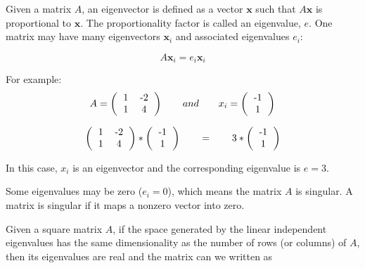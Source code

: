 \documentclass[justified,sixbynine]{tufte-book}
\theoremstyle{plain}%
\theoremstyle{definition}
\theoremstyle{remark}
\begin{document}
\begin{fullwidth}

Given a matrix $A$, an eigenvector is defined as a vector $\mathbf{x}$ such that
$A\mathbf{x}$ is proportional to $\mathbf{x}$.
The proportionality factor is called an eigenvalue, $e$. One matrix may have many eigenvectors $\mathbf{x}_i$ and associated eigenvalues $e_i$:

\begin{equation}
A\mathbf{x}_i = e_i\mathbf{x}_i
\end{equation}

For example:
\begin{equation}
A = \left(\begin{tabular}{ccc}
1 & -2  \\
1 & 4  \\
\end{tabular}\right) \qquad and \qquad
x_i =
\left(\begin{tabular}{c}
-1 \\
1 \\
\end{tabular}\right)
\end{equation}

\begin{equation}
\left(\begin{tabular}{ccc}
1 & -2  \\
1 & 4  \\
\end{tabular}\right) *
\left(\begin{tabular}{c}
-1 \\
1 \\
\end{tabular}\right) \qquad =  \qquad
3 * \left(\begin{tabular}{c}
-1 \\
1 \\
\end{tabular}\right)
\end{equation}

In this case, $x_i$ is an eigenvector and the corresponding eigenvalue is $e=3$.

Some eigenvalues may be zero ($e_i=0$), which means the matrix $A$ is singular. A matrix is singular if it maps a nonzero vector into zero.

Given a square matrix $A$, if the space generated by the linear independent eigenvalues has the same dimensionality as the number of rows (or columns) of $A$, then its eigenvalues are real and the matrix can we written as


\end{fullwidth}
\end{document}
